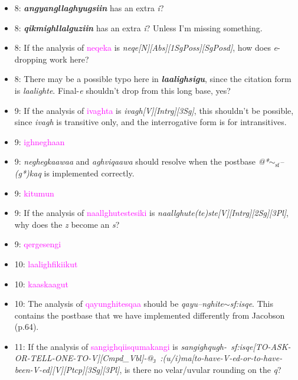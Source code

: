 \documentclass{article}
\begin{document}
\begin{itemize}
\item 8: \textit{\textbf{angyangllaghyugsiin}} has an extra \textit{i}?

\item 8: \textit{\textbf{qikmighllalguziin}} has an extra \textit{i}?
%
Unless I'm missing something.

\item 8: If the analysis of \textcolor{magenta}{neqeka} is \textit{neqe[N][Abs][1SgPoss][SgPosd]}, how does \textit{e}-dropping work here?

\item 8: There may be a possible typo here in \textit{\textbf{laalighsigu}}, since the citation form is \textit{laalighte}.
%
Final-\textit{e} shouldn't drop from this long base, yes?

\item 9: If the analysis of \textcolor{magenta}{ivaghta} is \textit{ivagh[V][Intrg][3Sg]}, this shouldn't be possible, since \textit{ivagh} is transitive only, and the interrogative form is for intransitives.

\item 9: \textcolor{magenta}{ighneghaan}

\item 9: \textit{neghegkaawaa} and \textit{aghviqaawa} should resolve when the postbase \textit{@*$\sim_\text{sf}$--(g*)kaq} is implemented correctly.

\item 9: \textcolor{magenta}{kitumun}

\item 9: If the analysis of \textcolor{magenta}{naallghutestesiki} is \textit{naallghute(te)ste[V][Intrg][2Sg][3Pl]}, why does the \textit{z} become an \textit{s}?

\item 9: \textcolor{magenta}{qergesengi}

\item 10: \textcolor{magenta}{laalighfikiikut}

\item 10: \textcolor{magenta}{kaaskaagut}

\item 10: The analysis of \textcolor{magenta}{qayunghitesqaa} should be \textit{qayu--nghite$\sim$sf:isqe}.
%
This contains the postbase that we have implemented differently from Jacobson (p.64).

\item 11: If the analysis of \textcolor{magenta}{sangighqiisqumakangi} is \textit{sangighqugh-~sf:isqe[TO-ASK-OR-TELL-ONE-TO-V][Cmpd\_Vbl]-@₃~:(u/i)ma[to-have-V-ed-or-to-have-been-V-ed][V][Ptcp][3Sg][3Pl]}, is there no velar/uvular rounding on the \textit{q}?


\end{itemize}
\end{document}
